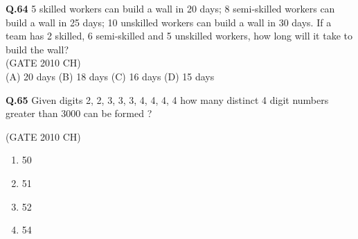 \documentclass[journal,12pt,onecolumn]{exam}
\theoremstyle{remark}
\begin{document}
\noindent\textbf{Q.64} 5 skilled workers can build a wall in 20 days; 8 semi-skilled workers can build a wall in 25 days; 10 unskilled workers can build a wall in 30 days. If a team has 2 skilled, 6 semi-skilled and 5 unskilled workers, how long will it take to build the wall?\\

\hfill{(GATE 2010 CH)}\\

(A) 20 days \hspace{1cm}
(B) 18 days \hspace{1cm}
(C) 16 days \hspace{1cm}
(D) 15 days

\noindent
\textbf{Q.65}
Given digits 2, 2, 3, 3, 3, 4, 4, 4, 4 how many distinct 4 digit numbers greater than 3000 can be formed ?

\hfill{(GATE 2010 CH)}\\

\begin{enumerate}
    \item 50
    \item 51
    \item 52
    \item 54
    
\end{enumerate}
 
\end{document}
